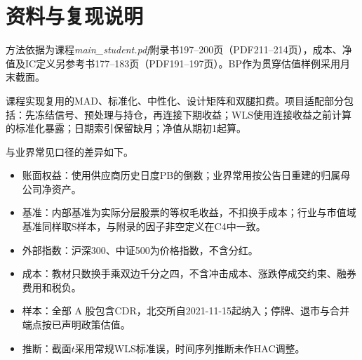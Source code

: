 \appendix
\section{资料与复现说明}

方法依据为课程\textit{main\_student.pdf}附录书197--200页（PDF211--214页），成本、净值及IC定义另参考书177--183页（PDF191--197页）。BP作为贯穿估值样例采用月末截面。

课程实现复用的MAD、标准化、中性化、设计矩阵和双腿扣费。项目适配部分包括：先冻结信号、预处理与持仓，再连接下期收益；WLS使用连接收益之前计算的标准化暴露；日期索引保留缺月；净值从期初1起算。

与业界常见口径的差异如下。
\begin{itemize}\setlength{\itemsep}{0pt}
\item 账面权益：使用供应商历史日度PB的倒数；业界常用按公告日重建的归属母公司净资产。
\item 基准：内部基准为实际分层股票的等权毛收益，不扣换手成本；行业与市值域基准同样取S样本，与附录的因子非空定义在C4中一致。
\item 外部指数：沪深300、中证500为价格指数，不含分红。
\item 成本：教材只数换手乘双边千分之四，不含冲击成本、涨跌停成交约束、融券费用和税负。
\item 样本：全部 A 股包含CDR，北交所自2021-11-15起纳入；停牌、退市与合并端点按已声明政策估值。
\item 推断：截面$t$采用常规WLS标准误，时间序列推断未作HAC调整。
\end{itemize}

